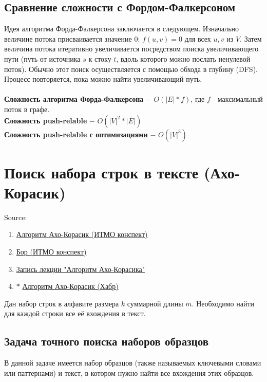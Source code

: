     \subsection{Сравнение сложности с Фордом-Фалкерсоном}
        Идея алгоритма Форда-Фалкерсона заключается в следующем. Изначально величине потока присваивается значение 0: $f(u,v)=0$ для всех $u,v$ из $V$. Затем величина потока итеративно увеличивается посредством поиска увеличивающего пути (путь от источника $s$ к стоку $t$, вдоль которого можно послать ненулевой поток). Обычно этот поиск осуществляется с помощью обхода в глубину (DFS). Процесс повторяется, пока можно найти увеличивающий путь.\\\\
        \textbf{Сложность алгоритма Форда-Фалкерсона} $-$ $O(|E|*f)$, где $f$ - максимальный поток в графе.\\
        \textbf{Сложность push-relable} $-$ $O(|V|^2*|E|)$\\
        \textbf{Сложность push-relable с оптимизациями} $-$ $O(|V|^3)$\\

\newpage
\section{Поиск набора строк в тексте (Ахо-Корасик)}
    Source:
    \begin{enumerate}
        \item \href{https://neerc.ifmo.ru/wiki/index.php?title=Алгоритм_Ахо-Корасик}{Алгоритм Ахо-Корасик (ИТМО конспект)}
        \item \href{https://neerc.ifmo.ru/wiki/index.php?title=Бор}{Бор (ИТМО конспект)}
        \item \href{https://vec.etu.ru/moodle/mod/resource/view.php?id=155087}{Запись лекции "Алгоритм Ахо-Корасика"}
        \item $\ast$ \href{https://habr.com/ru/articles/198682/}{Алгоритм Ахо-Корасик (Хабр)}
    \end{enumerate}

    Дан набор строк в алфавите размера $k$ суммарной длины $m$. Необходимо найти для каждой строки все её вхождения в текст.
    \subsection{Задача точного поиска наборов образцов}
        В данной задаче имеется набор образцов (также называемых ключевыми словами или паттернами) и текст, в котором нужно найти все вхождения этих образцов. 


